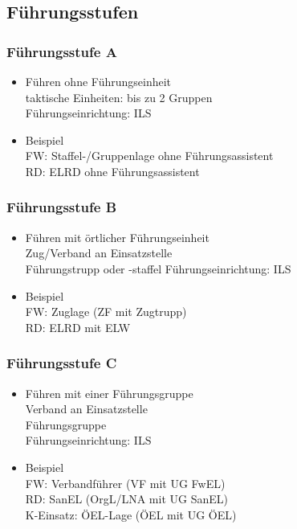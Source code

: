 \subsection{Führungsstufen}
\begin{normbox}{\subsubsection{Führungsstufe A}}
    \begin{itemize}
        \item Führen ohne Führungseinheit\\
        \ra taktische Einheiten: bis zu 2 Gruppen\\
        \ra Führungseinrichtung: ILS
        \item Beispiel\\
        \ra FW: Staffel-/Gruppenlage ohne Führungsassistent\\
        \ra RD: ELRD ohne Führungsassistent
    \end{itemize}
\end{normbox}
\begin{normbox}{\subsubsection{Führungsstufe B}}
    \begin{itemize}
        \item Führen mit örtlicher Führungseinheit\\
        \ra Zug/Verband an Einsatzstelle\\
        \ra Führungstrupp oder -staffel
        \ra Führungseinrichtung: ILS
        \item Beispiel\\
        \ra FW: Zuglage (ZF mit Zugtrupp)\\
        \ra RD: ELRD mit ELW
    \end{itemize}
\end{normbox}
\begin{normbox}{\subsubsection{Führungsstufe C}}
    \begin{itemize}
        \item Führen mit einer Führungsgruppe\\
        \ra Verband an Einsatzstelle\\
        \ra Führungsgruppe\\
        \ra Führungseinrichtung: ILS
        \item Beispiel\\
        \ra FW: Verbandführer (VF mit UG FwEL)\\
        \ra RD: SanEL (OrgL/LNA mit UG SanEL)\\
        \ra K-Einsatz: ÖEL-Lage (ÖEL mit UG ÖEL)
    \end{itemize}
\end{normbox}
